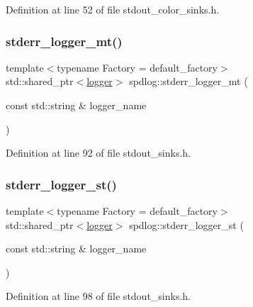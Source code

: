 Definition at line 52 of file stdout\+\_\+color\+\_\+sinks.\+h.

\mbox{\label{namespacespdlog_a93e154fd1e2eb0dc5a82fb25ce7f11d1}} 
\subsubsection{\texorpdfstring{stderr\+\_\+logger\+\_\+mt()}{stderr\_logger\_mt()}}
{\footnotesize\ttfamily template$<$typename Factory  = default\+\_\+factory$>$ \\
std\+::shared\+\_\+ptr$<$\hyperlink{classspdlog_1_1logger}{logger}$>$ spdlog\+::stderr\+\_\+logger\+\_\+mt (\begin{DoxyParamCaption}\item[{const std\+::string \&}]{logger\+\_\+name }\end{DoxyParamCaption})\hspace{0.3cm}{\ttfamily [inline]}}



Definition at line 92 of file stdout\+\_\+sinks.\+h.

\mbox{\label{namespacespdlog_ad2b234c875e76840785f02b189c0d514}} 
\subsubsection{\texorpdfstring{stderr\+\_\+logger\+\_\+st()}{stderr\_logger\_st()}}
{\footnotesize\ttfamily template$<$typename Factory  = default\+\_\+factory$>$ \\
std\+::shared\+\_\+ptr$<$\hyperlink{classspdlog_1_1logger}{logger}$>$ spdlog\+::stderr\+\_\+logger\+\_\+st (\begin{DoxyParamCaption}\item[{const std\+::string \&}]{logger\+\_\+name }\end{DoxyParamCaption})\hspace{0.3cm}{\ttfamily [inline]}}



Definition at line 98 of file stdout\+\_\+sinks.\+h.

\mbox{\label{namespacespdlog_a903467b7174af13d10f2f29ae9bd4a6e}} 
